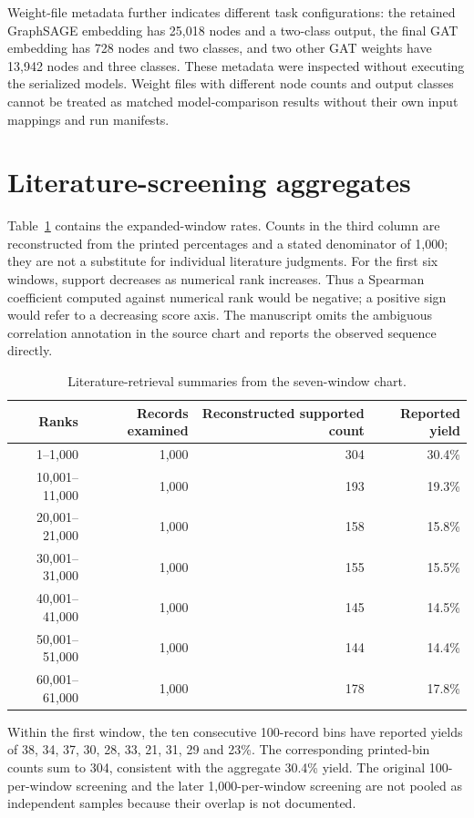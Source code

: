 Weight-file metadata further indicates different task configurations: the retained GraphSAGE embedding has 25,018 nodes and a two-class output, the final GAT embedding has 728 nodes and two classes, and two other GAT weights have 13,942 nodes and three classes. These metadata were inspected without executing the serialized models. Weight files with different node counts and output classes cannot be treated as matched model-comparison results without their own input mappings and run manifests.



\section{Literature-screening aggregates}
Table~\ref{tab:windows} contains the expanded-window rates. Counts in the third column are reconstructed from the printed percentages and a stated denominator of 1,000; they are not a substitute for individual literature judgments. For the first six windows, support decreases as numerical rank increases. Thus a Spearman coefficient computed against numerical rank would be negative; a positive sign would refer to a decreasing score axis. The manuscript omits the ambiguous correlation annotation in the source chart and reports the observed sequence directly.

\begin{table}[htbp]
\centering\small
\caption{Literature-retrieval summaries from the seven-window chart.}
\label{tab:windows}
\begin{tabular}{rrrr}
\toprule
Ranks & Records examined & Reconstructed supported count & Reported yield \\
\midrule
1--1,000 & 1,000 & 304 & 30.4\% \\
10,001--11,000 & 1,000 & 193 & 19.3\% \\
20,001--21,000 & 1,000 & 158 & 15.8\% \\
30,001--31,000 & 1,000 & 155 & 15.5\% \\
40,001--41,000 & 1,000 & 145 & 14.5\% \\
50,001--51,000 & 1,000 & 144 & 14.4\% \\
60,001--61,000 & 1,000 & 178 & 17.8\% \\
\bottomrule
\end{tabular}
\end{table}

Within the first window, the ten consecutive 100-record bins have reported yields of 38, 34, 37, 30, 28, 33, 21, 31, 29 and 23\%. The corresponding printed-bin counts sum to 304, consistent with the aggregate 30.4\% yield. The original 100-per-window screening and the later 1,000-per-window screening are not pooled as independent samples because their overlap is not documented.

